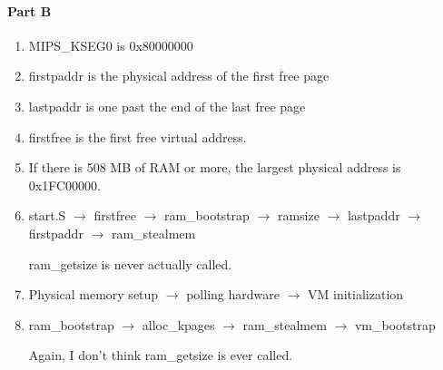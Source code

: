 \documentclass{proc}
\begin{document}
\paragraph{Part B}
\begin{enumerate}
	\item MIPS\_KSEG0 is 0x80000000
	\item firstpaddr is the physical address of the first free page
	\item lastpaddr is one past the end of the last free page
	\item firstfree is the first free virtual address.
	\item If there is 508 MB of RAM or more, the largest physical address is 0x1FC00000.
	\item start.S $\to$ firstfree $\to$ ram\_bootstrap $\to$ ramsize $\to$ lastpaddr $\to$ firstpaddr $\to$ ram\_stealmem
	
	ram\_getsize is never actually called.
	\item Physical memory setup $\to$ polling hardware $\to$ VM initialization
	\item ram\_bootstrap $\to$ alloc\_kpages $\to$ ram\_stealmem $\to$ vm\_bootstrap
	
	Again, I don't think ram\_getsize is ever called.
\end{enumerate}
\end{document}
